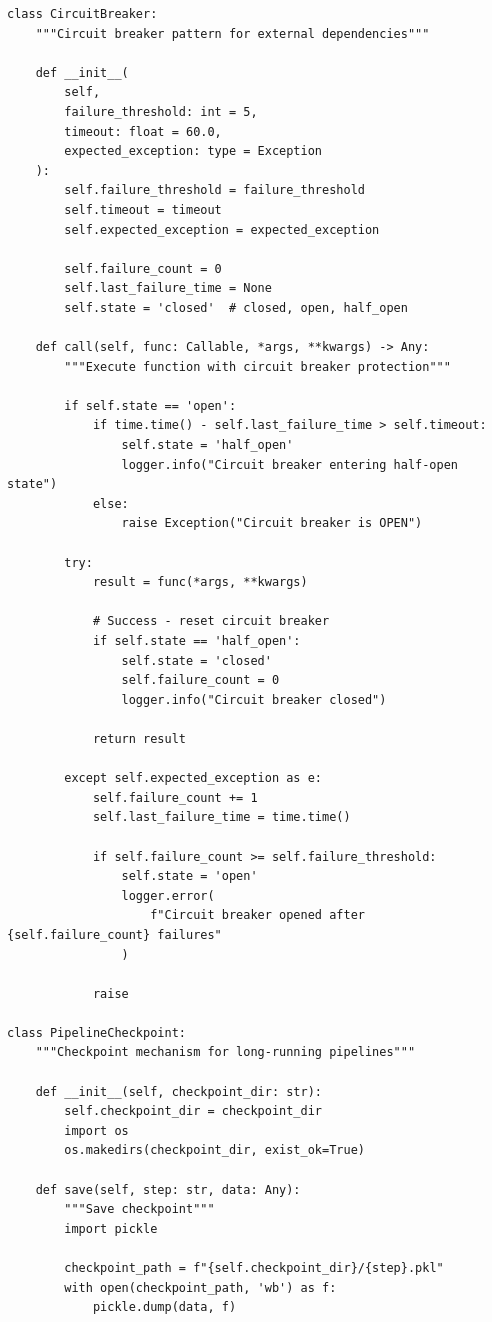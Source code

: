 \begin{lstlisting}[style=python, caption=Production-Grade Failure Handling]
class CircuitBreaker:
    """Circuit breaker pattern for external dependencies"""

    def __init__(
        self,
        failure_threshold: int = 5,
        timeout: float = 60.0,
        expected_exception: type = Exception
    ):
        self.failure_threshold = failure_threshold
        self.timeout = timeout
        self.expected_exception = expected_exception

        self.failure_count = 0
        self.last_failure_time = None
        self.state = 'closed'  # closed, open, half_open

    def call(self, func: Callable, *args, **kwargs) -> Any:
        """Execute function with circuit breaker protection"""

        if self.state == 'open':
            if time.time() - self.last_failure_time > self.timeout:
                self.state = 'half_open'
                logger.info("Circuit breaker entering half-open state")
            else:
                raise Exception("Circuit breaker is OPEN")

        try:
            result = func(*args, **kwargs)

            # Success - reset circuit breaker
            if self.state == 'half_open':
                self.state = 'closed'
                self.failure_count = 0
                logger.info("Circuit breaker closed")

            return result

        except self.expected_exception as e:
            self.failure_count += 1
            self.last_failure_time = time.time()

            if self.failure_count >= self.failure_threshold:
                self.state = 'open'
                logger.error(
                    f"Circuit breaker opened after {self.failure_count} failures"
                )

            raise

class PipelineCheckpoint:
    """Checkpoint mechanism for long-running pipelines"""

    def __init__(self, checkpoint_dir: str):
        self.checkpoint_dir = checkpoint_dir
        import os
        os.makedirs(checkpoint_dir, exist_ok=True)

    def save(self, step: str, data: Any):
        """Save checkpoint"""
        import pickle

        checkpoint_path = f"{self.checkpoint_dir}/{step}.pkl"
        with open(checkpoint_path, 'wb') as f:
            pickle.dump(data, f)


\end{lstlisting}

